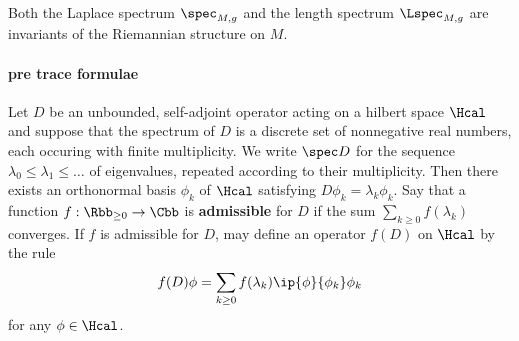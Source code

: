 



\begin{remark}\label{remark:metricInvariants}
  Both the Laplace spectrum $\spec_{M,g}$ and the length spectrum $\Lspec_{M,g}$ are invariants of the Riemannian structure on $M$.
\end{remark}

\paragraph{pre trace formulae}
Let $D$ be an unbounded, self-adjoint operator acting on a hilbert space $\Hcal$ and suppose that the spectrum of $D$ is a discrete set of nonnegative real numbers, each occuring with finite multiplicity. We write $\spec D$ for the sequence $\lambda_0 \leq \lambda_1 \leq \dots$ of eigenvalues, repeated according to their multiplicity. Then there exists an orthonormal basis $\phi_k$ of $\Hcal$ satisfying $D \phi_k = \lambda_k \phi_k$. Say that a function $f: \Rbb_{\geq 0} \to \Cbb$ is \textbf{admissible} for $D$ if the sum $\sum_{k\geq 0}f(\lambda_k)$ converges.  If $f$ is admissible for $D$, may define an operator $f(D)$ on $\Hcal$ by the rule
\begin{align} \label{eq:spectrum}
  f(D) \phi = \sum_{k\geq 0} f(\lambda_k) \ip {\phi}{\phi_k} \phi_k
\end{align}
for any $\phi\in \Hcal$.

